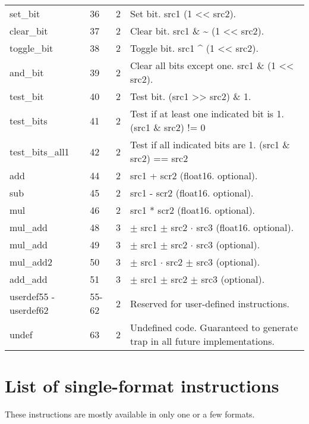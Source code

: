\documentclass[forwardcom.tex]{subfiles}
\begin{document}
\begin{longtable} {|p{25mm}|p{12mm}|p{12mm}|p{100mm}|}
set\_bit     & 36 & 2 & Set bit. src1 \textbar{} (1 \textless\textless{} src2). \\
clear\_bit   & 37 & 2 & Clear bit. src1 \& \~{} (1 \textless\textless{} src2). \\
toggle\_bit  & 38 & 2 & Toggle bit. src1 \^{} (1 \textless\textless{} src2). \\
and\_bit     & 39 & 2 & Clear all bits except one. src1 \&{} (1 \textless\textless{} src2). \\
test\_bit    & 40 & 2 & Test bit. (src1 \textgreater\textgreater{} src2) \& 1. \\
test\_bits   & 41 & 2 & Test if at least one indicated bit is 1. (src1 \& src2) != 0 \\
test\_bits\_all1 & 42 & 2 & Test if all indicated bits are 1. (src1 \& src2) == src2 \\
add          & 44 & 2 & src1 + scr2 (float16. optional). \\
sub          & 45 & 2 & src1 - scr2 (float16. optional). \\
mul          & 46 & 2 & src1 * scr2 (float16. optional). \\
mul\_add     & 48 & 3 & $\pm$ src1 $\pm$ src2 $\cdot$ src3 (float16. optional). \\
mul\_add     & 49 & 3 & $\pm$ src1 $\pm$ src2 $\cdot$ src3 (optional). \\
mul\_add2    & 50 & 3 & $\pm$ src1 $\cdot$ src2 $\pm$ src3 (optional). \\
add\_add     & 51 & 3 & $\pm$ src1 $\pm$ src2 $\pm$ src3 (optional). \\
userdef55 - userdef62
             & 55-62 & 2 & Reserved for user-defined instructions. \\
undef        & 63 & 2 & Undefined code. Guaranteed to generate trap in all future implementations. \\
\hline
\end{longtable}


\section{List of single-format instructions}
These instructions are mostly available in only one or a few formats.
\end{document}
